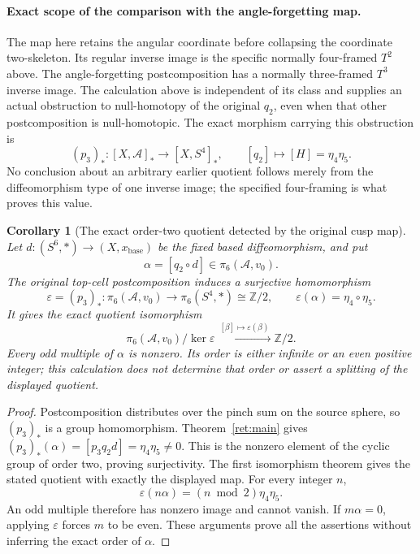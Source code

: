 \documentclass[11pt,letterpaper]{article}
\numberwithin{equation}{section}
\newtheorem{corollary}[theorem]{Corollary}
\theoremstyle{definition}
\theoremstyle{remark}
\begin{document}
\paragraph{Exact scope of the comparison with the angle-forgetting map.}
The map here retains the angular coordinate before collapsing the
coordinate two-skeleton.  Its regular inverse image is the specific
normally four-framed \(T^2\) above.  The angle-forgetting
postcomposition has a normally three-framed \(T^3\) inverse image.
The calculation above is independent of its class and supplies an
actual obstruction to null-homotopy of the original \(q_2\), even
when that other postcomposition is null-homotopic.  The exact
morphism carrying this obstruction is
\[
 (p_3)_*:[X,\mathcal A]_*\longrightarrow[X,S^4]_*,\qquad
 [q_2]\longmapsto[H]=\eta_4\eta_5.
\]
No conclusion about an arbitrary earlier quotient follows merely
from the diffeomorphism type of one inverse image; the specified
four-framing is what proves this value.

\begin{corollary}[The exact order-two quotient detected by the original cusp map]
\label{ret:q2-detected-quotient}
Let \(d:(S^6,*)\to(X,x_{\mathrm{base}})\) be the fixed based
diffeomorphism, and put
\[
\alpha=[q_2\circ d]\in\pi_6(\mathcal A,v_0).
\]
The original top-cell postcomposition induces a surjective homomorphism
\[
\varepsilon=(p_3)_*:\pi_6(\mathcal A,v_0)
  \longrightarrow\pi_6(S^4,*)\cong\mathbb Z/2,
\qquad \varepsilon(\alpha)=\eta_4\circ\eta_5.
\]
It gives the exact quotient isomorphism
\[
\pi_6(\mathcal A,v_0)/\ker\varepsilon
 \xrightarrow{\ [\beta]\mapsto\varepsilon(\beta)\ }
\mathbb Z/2.
\]
Every odd multiple of \(\alpha\) is nonzero. Its order is either
infinite or an even positive integer; this calculation does not determine
that order or assert a splitting of the displayed quotient.
\end{corollary}
\begin{proof}
Postcomposition distributes over the pinch sum on the source sphere,
so \((p_3)_*\) is a group homomorphism. Theorem~\ref{ret:main}
gives \((p_3)_*(\alpha)=[p_3q_2d]=\eta_4\eta_5\ne0\).
This is the nonzero element of the cyclic group of order two, proving
surjectivity. The first isomorphism theorem gives the stated quotient
with exactly the displayed map. For every integer \(n\),
\[
\varepsilon(n\alpha)=(n\bmod2)\eta_4\eta_5.
\]
An odd multiple therefore has nonzero image and cannot vanish.
If \(m\alpha=0\), applying \(\varepsilon\) forces \(m\)
to be even. These arguments prove all the assertions without inferring
the exact order of \(\alpha\).
\end{proof}
\end{document}
